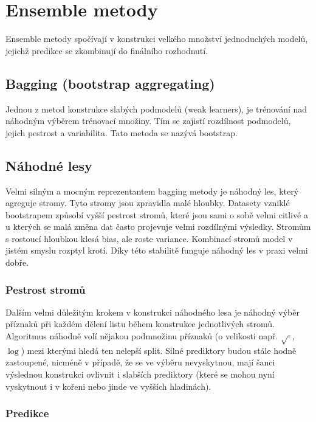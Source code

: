 \documentclass[../main.tex]{subfiles}
\begin{document}
\section{Ensemble metody}

Ensemble metody spočívají v konstrukci velkého množství jednoduchých modelů, jejichž predikce se zkombinují do finálního rozhodnutí.

\subsection{Bagging (bootstrap aggregating)}

Jednou z metod konstrukce slabých podmodelů (weak learners), je trénování nad náhodným výběrem trénovací množiny. Tím se zajistí rozdílnost podmodelů, jejich pestrost a variabilita. Tato metoda se nazývá bootstrap.

\subsection{Náhodné lesy}

Velmi silným a mocným reprezentantem bagging metody je náhodný les, který agreguje stromy. Tyto stromy jsou zpravidla malé hloubky. Datasety vzniklé bootstrapem způsobí vyšší pestrost stromů, které jsou sami o sobě velmi citlivé a u kterých se malá změna dat často projevuje velmi rozdílnými výsledky. Stromům s rostoucí hloubkou klesá bias, ale roste variance. Kombinací stromů model v jistém smyslu rozptyl krotí. Díky této stabilitě funguje náhodný les v praxi velmi dobře.

\subsubsection{Pestrost stromů}

Dalším velmi důležitým krokem v konstrukci náhodného lesa je náhodný výběr příznaků při každém dělení listu během konstrukce jednotlivých stromů. Algoritmus náhodně volí nějakou podmnožinu příznaků (o velikosti např. $\sqrt{\cdotp}$, $\log$) mezi kterými hledá ten nelepší split. Silné prediktory budou  stále hodně zastoupené, nicméně v případě, že se ve výběru nevyskytnou, mají šanci výslednou konstrukci ovlivnit i slabších prediktory (které se mohou nyní vyskytnout i v kořeni nebo jinde ve vyšších hladinách).

\subsubsection{Predikce}
\end{document}
